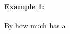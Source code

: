 \documentclass[../revisedmain.tex]{subfiles}
\begin{document}
\paragraph{Example 1:}By how much has a 
\end{document}
